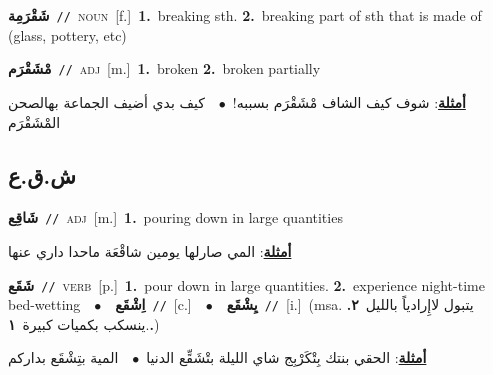 \documentclass[10pt,a4paper,twoside]{article} %
\begin{document}
\begin{multicols}{2}
{\setlength\topsep{0pt}\textbf{\foreignlanguage{arabic}{شَقْرَمِة}}\ {\color{gray}\texttt{//}\color{black}}\ \textsc{noun}\ [f.]\ \textbf{1.}~breaking sth.  \textbf{2.}~breaking part of sth that is made of (glass, pottery, etc)\ } \vspace{2mm}

{\setlength\topsep{0pt}\textbf{\foreignlanguage{arabic}{مْشَقْرَم}}\ {\color{gray}\texttt{//}\color{black}}\ \textsc{adj}\ [m.]\ \textbf{1.}~broken  \textbf{2.}~broken partially\  \begin{flushright}\color{gray}\foreignlanguage{arabic}{\textbf{\underline{\foreignlanguage{arabic}{أمثلة}}}: شوف كيف الشاف مْشَقْرَم بسببه!\ $\bullet$\ \  كيف بدي أضيف الجماعة بهالصحن المْشَقْرَم}\end{flushright}\color{black}} \vspace{2mm}

\vspace{-3mm}
\subsection*{\color{blue}\foreignlanguage{arabic}{ش.ق.ع}\color{blue}{}} 

{\setlength\topsep{0pt}\textbf{\foreignlanguage{arabic}{شَاقِع}}\ {\color{gray}\texttt{//}\color{black}}\ \textsc{adj}\ [m.]\ \textbf{1.}~pouring down in large quantities\  \begin{flushright}\color{gray}\foreignlanguage{arabic}{\textbf{\underline{\foreignlanguage{arabic}{أمثلة}}}: المي صارلها يومين شاقْعَة ماحدا داري عنها}\end{flushright}\color{black}} \vspace{2mm}

{\setlength\topsep{0pt}\textbf{\foreignlanguage{arabic}{شَقَع}}\ {\color{gray}\texttt{//}\color{black}}\ \textsc{verb}\ [p.]\ \textbf{1.}~pour down in large quantities.  \textbf{2.}~experience night-time bed-wetting\ \ $\bullet$\ \ \setlength\topsep{0pt}\textbf{\foreignlanguage{arabic}{اِشْقَع}}\ {\color{gray}\texttt{//}\color{black}}\ [c.]\ \ $\bullet$\ \ \setlength\topsep{0pt}\textbf{\foreignlanguage{arabic}{يِشْقَع}}\ {\color{gray}\texttt{//}\color{black}}\ [i.]\ \color{gray}(msa. \foreignlanguage{arabic}{يتبول لاإِرادياً بالليل}~\foreignlanguage{arabic}{\textbf{٢.}}  .\foreignlanguage{arabic}{ينسكب بكميات كبيرة}~\foreignlanguage{arabic}{\textbf{١.}})\color{black}\  \begin{flushright}\color{gray}\foreignlanguage{arabic}{\textbf{\underline{\foreignlanguage{arabic}{أمثلة}}}: الحقي بنتك بِتْكَرْبِج شاي الليلة بتْشَقِّع الدنيا\ $\bullet$\ \  المية بتِشْقَع بداركم}\end{flushright}\color{black}} \vspace{2mm}


\end{multicols}
\end{document}
